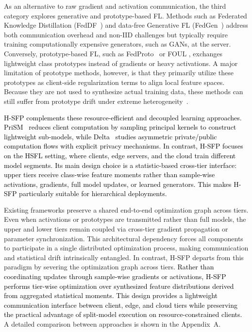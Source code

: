 As an alternative to raw gradient and activation communication, the third category explores generative and prototype-based FL. Methods such as Federated Knowledge Distillation (FedDF~\cite{lin2020ensemble}) and data-free Generative FL (FedGen~\cite{venkateswaran2023fedgen}) address both communication overhead and non-IID challenges but typically require training computationally expensive generators, such as GANs, at the server. Conversely, prototype-based FL, such as FedProto~\cite{tan2022fedproto} or FOUL \cite{nguyen2026computation}, exchanges lightweight class prototypes instead of gradients or heavy activations. A major limitation of prototype methods, however, is that they primarily utilize these prototypes as client-side regularization terms to align local feature spaces. Because they are not used to synthesize actual training data, these methods can still suffer from prototype drift under extreme heterogeneity~\cite{bensiah2025feddpa, zhang2020personalized}.

\textcolor{black}{H-SFP complements these resource-efficient and decoupled learning approaches. PriSM~\cite{niu2023overcoming} reduces client computation by sampling principal kernels to construct lightweight sub-models, while Delta~\cite{10655220} studies asymmetric private/public computation flows with explicit privacy mechanisms. In contrast, H-SFP focuses on the HSFL setting, where clients, edge servers, and the cloud train different model segments. Its main design choice is a statistic-based cross-tier interface: upper tiers receive class-wise feature moments rather than sample-wise activations, gradients, full model updates, or learned generators. This makes H-SFP particularly suitable for hierarchical deployments.}

Existing frameworks preserve a shared end-to-end optimization graph across tiers. Even when activations or prototypes are transmitted rather than full models, the upper and lower tiers remain coupled via cross-tier gradient propagation or parameter synchronization. This architectural dependency forces all components to participate in a single distributed optimization process, making communication and statistical drift intrinsically entangled.
In contrast, H-SFP departs from this paradigm by severing the optimization graph across tiers. \textcolor{black}{Rather than coordinating updates through sample-wise gradients or activations, H-SFP performs tier-wise optimization over synthesized feature distributions derived from aggregated statistical moments. This design provides a lightweight communication interface between client, edge, and cloud tiers while preserving the practical advantage of split-model execution on resource-constrained clients.}
A detailed comparison between approaches is shown in the Appendix~A.
